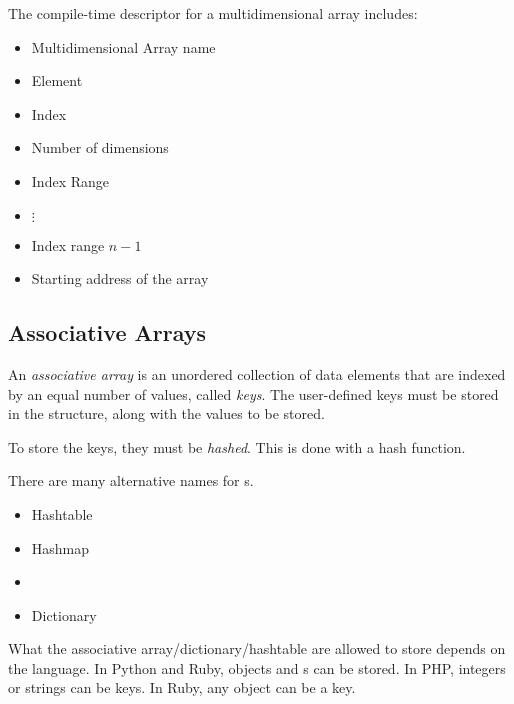 The compile-time descriptor for a multidimensional array includes:
\begin{itemize}[noitemsep]
\item Multidimensional Array name
\item Element 
\item Index 
\item Number of dimensions
\item Index Range
\item $\vdots$
\item Index range $n-1$
\item Starting address of the array
\end{itemize}

\subsection{Associative Arrays}\label{subsec:Associative_Arrays}
\begin{definition}\label{def:Associative_Array}
  An \emph{associative array} is an unordered collection of data elements that are indexed by an equal number of values, called \emph{keys}.
  The user-defined keys must be stored in the structure, along with the values to be stored.

  To store the keys, they must be \emph{hashed}.
  This is done with a hash function.

  \begin{remark}
    There are many alternative names for s.
    \begin{itemize}[noitemsep]
    \item Hashtable
    \item Hashmap
    \item {}
    \item Dictionary
    \end{itemize}
  \end{remark}

  \begin{remark}
    What the associative array/dictionary/hashtable are allowed to store depends on the language.
    In Python and Ruby, objects and s can be stored.
    In PHP, integers or strings can be keys.
    In Ruby, any object can be a key.
  \end{remark}
\end{definition}

